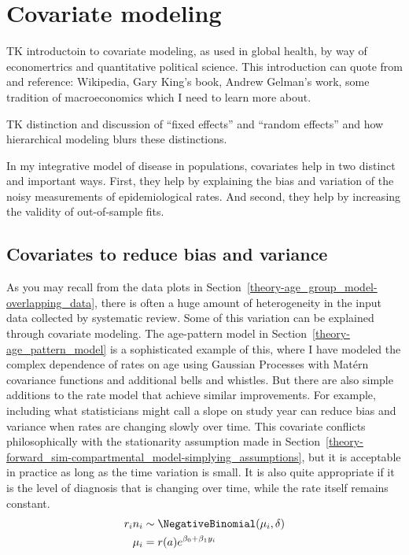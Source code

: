 \section{Covariate modeling}

TK introductoin to covariate modeling, as used in global health, by
way of economertrics and quantitative political science.  This
introduction can quote from and reference: Wikipedia, Gary King's
book, Andrew Gelman's work, some tradition of macroeconomics which I
need to learn more about.

TK distinction and discussion of ``fixed effects'' and ``random
effects'' and how hierarchical modeling blurs these distinctions.

In my integrative model of disease in populations, covariates help
in two distinct and important ways.  First, they help by
explaining the bias and variation of the noisy measurements of
epidemiological rates.  And second, they help by increasing the
validity of out-of-sample fits.


\subsection{Covariates to reduce bias and variance}

As you may recall from the data plots in
Section~\ref{theory-age_group_model-overlapping_data}, there is often
a huge amount of heterogeneity in the input data collected by
systematic review.  Some of this variation can be explained through
covariate modeling.  The age-pattern model in
Section~\ref{theory-age_pattern_model} is a sophisticated example of
this, where I have modeled the complex dependence of rates on age
using Gaussian Processes with Mat\'{e}rn covariance functions and
additional bells  and whistles.  But there are also simple additions
to the rate model that achieve similar improvements.  For example,
including what statisticians might call a slope on study year can
reduce bias and variance when rates are changing slowly over time.
This covariate conflicts philosophically with the stationarity
assumption made in
Section~\ref{theory-forward_sim-compartmental_model-simplying_assumptions},
but it is acceptable in practice as long as the time variation is
small.  It is also quite appropriate if it is the level of diagnosis
that is changing over time, while the rate itself remains constant.
\begin{align*}
r_i n_i &\sim \NegativeBinomial(\mu_i, \delta)\\
\mu_i &= r(a)e^{\beta_0 + \beta_1 y_i}
\end{align*}

